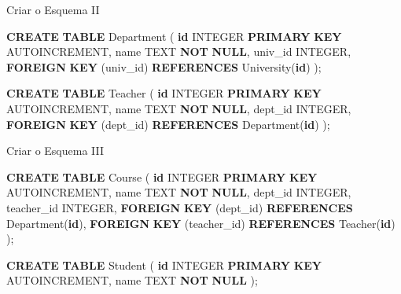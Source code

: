 \documentclass[
  ignorenonframetext,
]{beamer}
\newenvironment{Shaded}{}{}
\newcommand{\DataTypeTok}[1]{\textcolor[rgb]{0.56,0.13,0.00}{#1}}
\newcommand{\KeywordTok}[1]{\textcolor[rgb]{0.00,0.44,0.13}{\textbf{#1}}}
\newcommand{\NormalTok}[1]{#1}
\begin{document}
\begin{frame}[fragile]{Criar o Esquema II}
\protect{}\label{criar-o-esquema-ii}
\begin{Shaded}
\begin{Highlighting}[]
\KeywordTok{CREATE} \KeywordTok{TABLE}\NormalTok{ Department (}
    \KeywordTok{id} \DataTypeTok{INTEGER} \KeywordTok{PRIMARY} \KeywordTok{KEY}\NormalTok{ AUTOINCREMENT,}
\NormalTok{    name TEXT }\KeywordTok{NOT} \KeywordTok{NULL}\NormalTok{,}
\NormalTok{    univ\_id }\DataTypeTok{INTEGER}\NormalTok{,}
    \KeywordTok{FOREIGN} \KeywordTok{KEY}\NormalTok{ (univ\_id) }\KeywordTok{REFERENCES}\NormalTok{ University(}\KeywordTok{id}\NormalTok{)}
\NormalTok{);}

\KeywordTok{CREATE} \KeywordTok{TABLE}\NormalTok{ Teacher (}
    \KeywordTok{id} \DataTypeTok{INTEGER} \KeywordTok{PRIMARY} \KeywordTok{KEY}\NormalTok{ AUTOINCREMENT,}
\NormalTok{    name TEXT }\KeywordTok{NOT} \KeywordTok{NULL}\NormalTok{,}
\NormalTok{    dept\_id }\DataTypeTok{INTEGER}\NormalTok{,}
    \KeywordTok{FOREIGN} \KeywordTok{KEY}\NormalTok{ (dept\_id) }\KeywordTok{REFERENCES}\NormalTok{ Department(}\KeywordTok{id}\NormalTok{)}
\NormalTok{);}
\end{Highlighting}
\end{Shaded}
\end{frame}

\begin{frame}[fragile]{Criar o Esquema III}
\protect{}\label{criar-o-esquema-iii}
\begin{Shaded}
\begin{Highlighting}[]
\KeywordTok{CREATE} \KeywordTok{TABLE}\NormalTok{ Course (}
    \KeywordTok{id} \DataTypeTok{INTEGER} \KeywordTok{PRIMARY} \KeywordTok{KEY}\NormalTok{ AUTOINCREMENT,}
\NormalTok{    name TEXT }\KeywordTok{NOT} \KeywordTok{NULL}\NormalTok{,}
\NormalTok{    dept\_id }\DataTypeTok{INTEGER}\NormalTok{,}
\NormalTok{    teacher\_id }\DataTypeTok{INTEGER}\NormalTok{,}
    \KeywordTok{FOREIGN} \KeywordTok{KEY}\NormalTok{ (dept\_id) }\KeywordTok{REFERENCES}\NormalTok{ Department(}\KeywordTok{id}\NormalTok{),}
    \KeywordTok{FOREIGN} \KeywordTok{KEY}\NormalTok{ (teacher\_id) }\KeywordTok{REFERENCES}\NormalTok{ Teacher(}\KeywordTok{id}\NormalTok{)}
\NormalTok{);}

\KeywordTok{CREATE} \KeywordTok{TABLE}\NormalTok{ Student (}
    \KeywordTok{id} \DataTypeTok{INTEGER} \KeywordTok{PRIMARY} \KeywordTok{KEY}\NormalTok{ AUTOINCREMENT,}
\NormalTok{    name TEXT }\KeywordTok{NOT} \KeywordTok{NULL}
\NormalTok{);}
\end{Highlighting}
\end{Shaded}
\end{frame}
\end{document}
